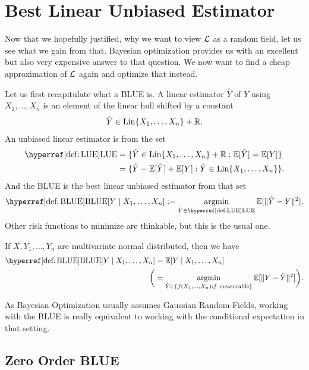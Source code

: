 \section{Best Linear Unbiased Estimator}

Now that we hopefully justified, why we want to view \(\mathcal{L}\) as a random field,
let us see what we gain from that. Bayesian optimization provides us with
an excellent but also very expensive answer to that question. We now want to
find a cheap approximation of \(\mathcal{L}\) again and optimize that instead.

Let us first recapitulate what a BLUE is. A linear estimator \(\hat{Y}\) of
\(Y\) using \(X_1,\dots,X_n\) is an element of the linear hull shifted by a
constant 
\begin{align*}
	\hat{Y}\in \operatorname{Lin}\{X_1,\dots,X_n\} + \mathbb{R}.
\end{align*}
An unbiased linear estimator is from the set
\begin{align}\label{def: LUE}
	\LUE
	&= \{ \hat{Y} \in \linHull\{X_1,\dots,X_n\} + \real : \E[\hat{Y}] = \E[Y]\}\\
	\nonumber
	&= \{ \hat{Y} - \E[\hat{Y}] + \E[Y] : \hat{Y} \in \linHull\{X_1,\dots,X_n\}\}.
\end{align}
And the BLUE is the best linear unbiased estimator from that set
\begin{align}\label{def: BLUE}
	\BLUE[Y\mid X_1,\dots, X_n] := \argmin_{\hat{Y}\in\LUE} \E[\|\hat{Y} - Y\|^2].
\end{align}
Other risk functions to minimize are thinkable, but this is the usual one.
\begin{lemma}\label{lem: blue is cond. expectation}
	If \(X,Y_1,\dots, Y_n\) are multivariate normal distributed, then we
	have
	\begin{align*}
		\BLUE[Y\mid X_1,\dots,X_n]
		&= \E[Y\mid X_1,\dots, X_n]\\
		\bigg(&=
		\argmin_{\hat{Y}\in\{f(X_1,\dots, X_n):f\ \text{measurable}\}} \E[\|Y-\hat{Y}\|^2]
		\bigg).
	\end{align*}
\end{lemma}
\begin{remark}
	As Bayesian Optimization usually assumes Gaussian Random Fields, working with
	the BLUE is really equivalent to working with the conditional expectation in
	that setting.
\end{remark}

\subsection{Zero Order BLUE}

